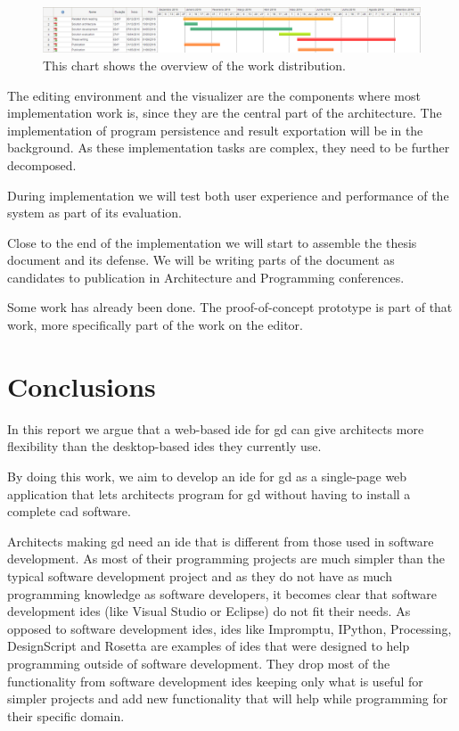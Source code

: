 \documentclass{./llncs2e/llncs}
\begin{document}
	\begin{figure}
		\centering
		\includegraphics[width=1.0\textwidth]{img/schedule}
		\caption{This chart shows the overview of the work distribution.}
		\label{fig:schedule}
	\end{figure}
	
	The editing environment and the visualizer are the components where most implementation work is, since they are the central part of the architecture.
	The implementation of program persistence and result exportation will be in the background.
	As these implementation tasks are complex, they need to be further decomposed.
	
	During implementation we will test both user experience and performance of the system as part of its evaluation.
	
	Close to the end of the implementation we will start to assemble the thesis document and its defense.
	We will be writing parts of the document as candidates to publication in Architecture and Programming conferences.
	
	Some work has already been done.
	The proof-of-concept prototype is part of that work, more specifically part of the work on the editor.
		
	

\section{Conclusions}
	In this report we argue that a web-based \ac{ide} for \ac{gd} can give architects more flexibility than the desktop-based \acp{ide} they currently use.

	By doing this work, we aim to develop an \acf{ide} for \acf{gd} as a single-page web application that lets architects program for \ac{gd} without having to install a complete \ac{cad} software.

	Architects making \ac{gd} need an \ac{ide} that is different from those used in software development.
	As most of their programming projects are much simpler than the typical software development project and as they do not have as much programming knowledge as software developers, it becomes clear that software development \acp{ide} (like Visual Studio or Eclipse) do not fit their needs.
	As opposed to software development \acp{ide}, \acp{ide} like Impromptu, IPython, Processing, DesignScript and Rosetta are examples of \acp{ide} that were designed to help programming outside of software development.
	They drop most of the functionality from software development \acp{ide}  keeping only what is useful for simpler projects and add new functionality that will help while programming for their specific domain.
	
\end{document}

